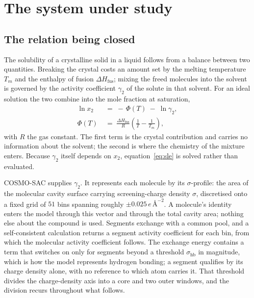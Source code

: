 \section{The system under study}
\label{sec:system}

\subsection{The relation being closed}

The solubility of a crystalline solid in a liquid follows from a balance between two quantities.
Breaking the crystal costs an amount set by the melting temperature $T_m$ and the enthalpy of
fusion $\Delta H_{\mathrm{fus}}$; mixing the freed molecules into the solvent is governed by the
activity coefficient $\gamma_2$ of the solute in that solvent. For an ideal solution the two
combine into the mole fraction at saturation,
%
\begin{equation}
\begin{aligned}
\ln x_2 &\;=\; -\,\Phi(T) \;-\; \ln \gamma_2 , \\[2pt]
\Phi(T) &\;=\; \frac{\Delta H_{\mathrm{fus}}}{R}
          \left(\frac{1}{T} - \frac{1}{T_m}\right),
\end{aligned}
\label{eq:sle}
\end{equation}
%
with $R$ the gas constant. The first term is the crystal contribution and carries no information
about the solvent; the second is where the chemistry of the mixture enters. Because $\gamma_2$
itself depends on $x_2$, equation~\eqref{eq:sle} is solved rather than evaluated.

COSMO-SAC \cite{lin2002} supplies $\gamma_2$. It represents each molecule by its $\sigma$-profile:
the area of the molecular cavity surface carrying screening-charge density $\sigma$, discretised
onto a fixed grid of $51$ bins spanning roughly $\pm 0.025\,e\,\text{\AA}^{-2}$. A molecule's
identity enters the model through this vector and through the total cavity area; nothing else
about the compound is used. Segments exchange with a common pool, and a self-consistent
calculation returns a segment activity coefficient for each bin, from which the molecular activity
coefficient follows. The exchange energy contains a term that switches on only for segments beyond
a threshold $\sigma_{\mathrm{hb}}$ in magnitude, which is how the model represents hydrogen
bonding; a segment qualifies by its charge density alone, with no reference to which atom carries
it. That threshold divides the charge-density axis into a core and two outer windows, and the
division recurs throughout what follows.

